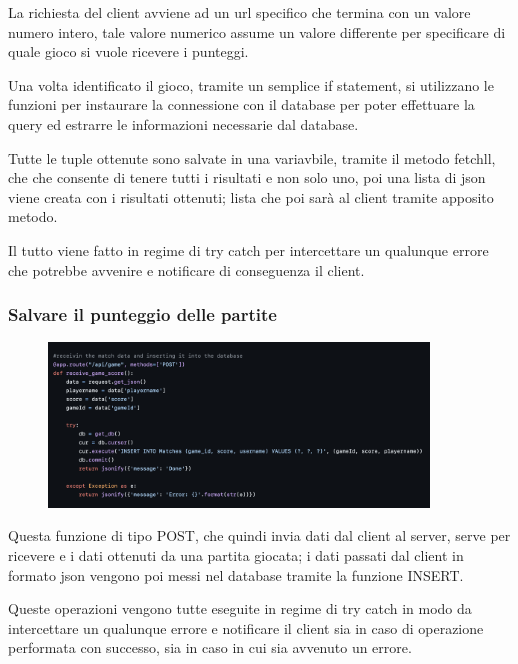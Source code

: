 \documentclass{article}
\begin{document}
La richiesta del client avviene ad un url specifico che termina con un valore numero intero, tale valore numerico assume un valore differente per specificare di quale gioco si vuole ricevere i punteggi.

Una volta identificato il gioco, tramite un semplice if statement, si utilizzano le funzioni per instaurare la connessione con il database per poter effettuare la query ed estrarre le informazioni necessarie dal database.

Tutte le tuple ottenute sono salvate in una variavbile, tramite il metodo fetchll, che che consente di tenere tutti i risultati e non solo uno, poi una lista di json viene creata con i risultati ottenuti; lista che poi sarà al client tramite apposito metodo.

Il tutto viene fatto in regime di try catch per intercettare un qualunque errore che potrebbe avvenire e notificare di conseguenza il client.

\subsubsection{Salvare il punteggio delle partite}

\begin{figure}[H]
    \centering
    \includegraphics[width=0.9\textwidth]{images/salvare_punteggio_partite.png}
\end{figure}
Questa funzione di tipo POST, che quindi invia dati dal client al server, serve per ricevere e i dati ottenuti da una partita giocata; i dati passati dal client in formato json vengono poi messi nel database tramite la funzione INSERT. 

Queste operazioni vengono tutte eseguite in regime di try catch in modo da intercettare un qualunque errore e notificare il client sia in caso di operazione performata con successo, sia in caso in cui sia avvenuto un errore.
\end{document}
